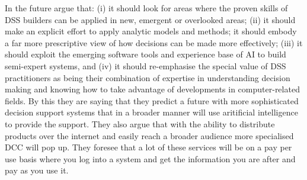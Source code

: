 In the future \cite{shim2002past} argue that:
(i) it should look for areas where the proven skills of DSS builders can be applied in new, emergent or overlooked areas; (ii) it should make an explicit effort to apply analytic models and methods; it should embody a far more prescriptive view of how decisions can be made more effectively; (iii) it should exploit the emerging software tools and
experience base of AI to build semi-expert systems, and (iv) it should re-emphasise the special value of DSS practitioners as being their combination of expertise in understanding decision making and knowing how to take advantage of developments in computer-related fields.
By this they are saying that they predict a future with more sophisticated decision support systems that in a broader manner will use aritificial intelligence to provide the support. They also argue that with the ability to distribute products over the internet and easily reach a broader audience more specialised DCC will pop up. They foresee that a lot of these services will be on a pay per use basis where you log into a system and get the information you are after and pay as you use it.